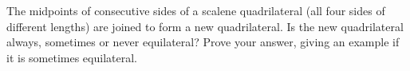 The midpoints of consecutive sides of a scalene quadrilateral (all four sides of different lengths) are joined to form a new quadrilateral. Is the new quadrilateral always, sometimes or never equilateral? Prove your answer, giving an example if it is sometimes equilateral.

